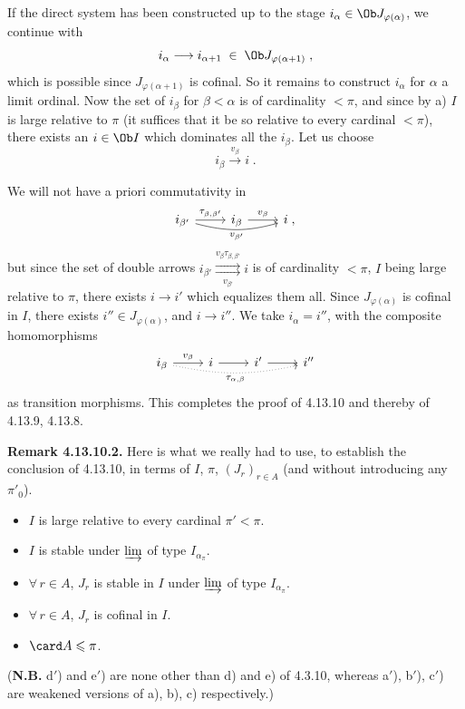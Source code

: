If the direct system has been constructed up to the stage $i_\alpha\in\Ob J_{\varphi(\alpha)}$, we continue with
\[ i_\alpha \longrightarrow i_{\alpha+1} \; \in \; \Ob J_{\varphi(\alpha+1)} \; , \]
which is possible since $J_{\varphi(\alpha+1)}$ is
cofinal. So it remains to construct $i_\alpha$ for $\alpha$ a limit ordinal. Now the set of $i_\beta$ for $\beta<\alpha$ is of cardinality $<\pi$, and since by a) $I$ is large relative to $\pi$ (it suffices that it be so relative to every cardinal $<\pi$), there exists an $i\in\Ob I$ which dominates all the $i_\beta$. Let us choose
\[ i_\beta \xrightarrow{v_\beta} i \; . \]

We will not have a priori commutativity in
\[
\begin{tikzcd}
i_{\beta'} \arrow[r, "\tau_{\beta,\beta'}"] \arrow[rr, bend right=15, "v_{\beta'}"'] & i_\beta \arrow[r, "v_\beta"] & i \; ,
\end{tikzcd}
\] %
but since the set of double arrows $i_{\beta'}\mathrel{\overset{v_\beta\tau_{\beta,\beta'}}{\underset{v_{\beta'}}{\rightrightarrows}}} i$ is of cardinality $<\pi$, $I$ being large relative to $\pi$, there exists $i\longrightarrow i'$ which equalizes them all. Since $J_{\varphi(\alpha)}$ is cofinal in $I$, there exists $i''\in J_{\varphi(\alpha)}$, and $i\longrightarrow i''$. We take $i_\alpha=i''$, with the composite homomorphisms
\[
\begin{tikzcd}
i_\beta \arrow[r, "v_\beta"] \arrow[rrr, dotted, bend right=12, "\tau_{\alpha,\beta}"'] & i \arrow[r] & i' \arrow[r] & i''
\end{tikzcd}
\] %
as transition morphisms. This completes the proof of 4.13.10 and thereby of 4.13.9, 4.13.8.

\textbf{Remark 4.13.10.2.} Here is what we really had to use, to establish the conclusion of 4.13.10, in terms of $I$, $\pi$, $(J_r)_{r\in A}$ (and without introducing any $\pi'_0$).
\begin{itemize}
\item[\cercle{a$'$}] $I$ is large relative to every cardinal $\pi'<\pi$.
\item[\cercle{b$'$}] $I$ is stable under $\varinjlim$ of type $I_{\alpha_\pi}$.
\item[\cercle{c$'$}] $\forall\, r\in A$, $J_r$ is stable in $I$ under $\varinjlim$ of type $I_{\alpha_\pi}$.
\item[\cercle{d$'$}] $\forall\, r\in A$, $J_r$ is cofinal in $I$.
\item[\cercle{e$'$}] $\card A\leqslant\pi$.
\end{itemize}
(\textbf{N.B.} d$'$) and e$'$) are none other than d) and e) of 4.3.10, whereas a$'$), b$'$), c$'$) are weakened versions of a), b), c) respectively.) %

